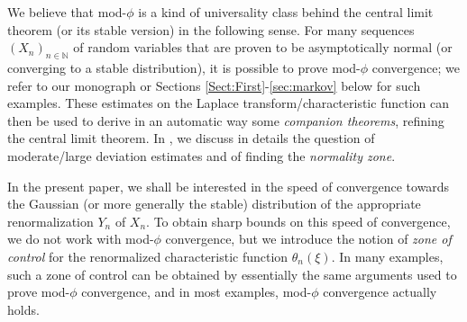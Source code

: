 \documentclass[envcountsame]{svmult}
\newcommand{\N}{\mathbb{N}}
\begin{document}
We believe that mod-$\phi$ is a kind of universality class behind the central limit theorem (or its stable version)
in the following sense.
For many sequences $(X_n)_{n \in \N}$ of random variables that are proven to be asymptotically normal (or converging to a stable distribution),
it is possible to prove mod-$\phi$ convergence;
we refer to our monograph \cite{FMN16} or Sections \ref{Sect:First}-\ref{sec:markov} below for such examples.
These estimates on the Laplace transform/characteristic function can then be used to derive
in an automatic way some {\em companion theorems}, refining the central limit theorem.
In \cite{FMN16}, we discuss in details the question of moderate/large deviation estimates
and of finding the {\em normality zone}.\medskip

In the present paper, we shall be interested in the speed of convergence towards the Gaussian (or more generally the stable) distribution
of the appropriate renormalization $Y_n$ of $X_n$.
To obtain sharp bounds on this speed of convergence, we do not work with mod-$\phi$ convergence,
but we introduce the notion of \emph{zone of control} for the renormalized characteristic function $\theta_n(\xi)$.
In many examples, such a zone of control can be obtained by essentially the same arguments 
used to prove mod-$\phi$ convergence, and in most examples, mod-$\phi$ convergence actually holds.
\end{document}

